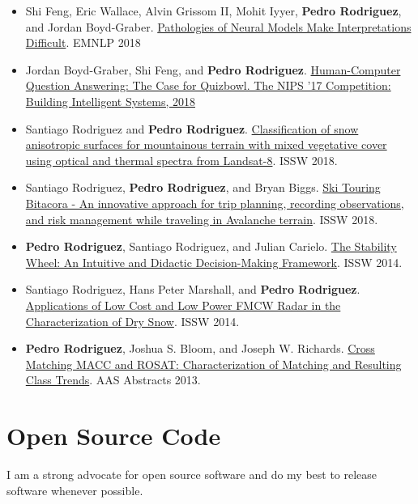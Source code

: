 \documentclass[11pt,a4paper,sans]{moderncv} %
\begin{document}
{\begin{itemize}
    \item Shi Feng, Eric Wallace, Alvin Grissom II, Mohit Iyyer, \textbf{Pedro Rodriguez}, and Jordan Boyd-Graber. \href{https://arxiv.org/abs/1804.07781}{Pathologies of Neural Models Make Interpretations Difficult}. EMNLP 2018
    \item Jordan Boyd-Graber, Shi Feng, and \textbf{Pedro Rodriguez}. \href{https://www.entilzha.io/static/publications/2018_nips_qbcomp.pdf}{Human-Computer Question Answering: The Case for Quizbowl. The NIPS '17 Competition: Building Intelligent Systems, 2018}
	\item Santiago Rodriguez and \textbf{Pedro Rodriguez}. \href{https://arc.lib.montana.edu/snow-science/objects/ISSW2018_P04.4.pdf}{Classification of snow anisotropic surfaces for mountainous terrain with mixed vegetative cover using optical and thermal spectra from Landsat-8}. ISSW 2018.
	\item Santiago Rodriguez, \textbf{Pedro Rodriguez}, and Bryan Biggs. \href{https://arc.lib.montana.edu/snow-science/objects/ISSW2018_P18.4.pdf}{Ski Touring Bitacora - An innovative approach for trip planning, recording observations, and risk management while traveling in Avalanche terrain}. ISSW 2018.
	\item \textbf{Pedro Rodriguez}, Santiago Rodriguez, and Julian Carielo. \href{http://arc.lib.montana.edu/snow-science/objects/ISSW14_paper_P4.34.pdf}{The Stability Wheel: An Intuitive and Didactic Decision-Making Framework}. ISSW 2014.
	\item Santiago Rodriguez, Hans Peter Marshall, and \textbf{Pedro Rodriguez}. \href{http://citeseerx.ist.psu.edu/viewdoc/download?doi=10.1.1.977.7907&rep=rep1&type=pdf}{Applications of Low Cost and Low Power FMCW Radar in the Characterization of Dry Snow}. ISSW 2014.
	\item \textbf{Pedro Rodriguez}, Joshua S. Bloom, and Joseph W. Richards. \href{http://adsabs.harvard.edu/abs/2013AAS...22135428R}{Cross Matching MACC and ROSAT: Characterization of Matching and Resulting Class Trends}. AAS Abstracts 2013.
  \end{itemize}
}{}

\section{Open Source Code}

I am a strong advocate for open source software and do my best to release software whenever possible.
\vspace{1ex}
\end{document}
